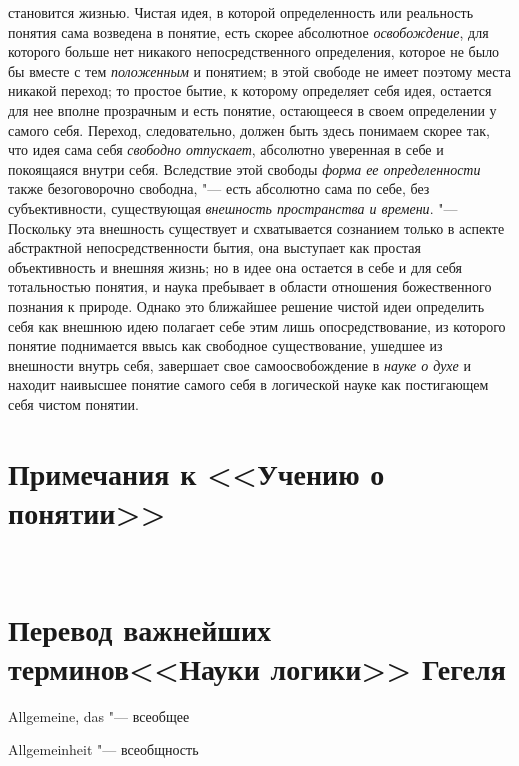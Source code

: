 {{{становится жизнью}. Чистая идея, в которой определенность
или реальность понятия сама возведена в понятие, есть скорее абсолютное
{\em освобождение}, для
которого больше нет никакого непосредственного определения, которое не было
бы вместе с тем {\em положенным}
и понятием; в этой свободе не имеет поэтому места никакой
переход; то простое бытие, к которому определяет себя идея, остается для
нее вполне прозрачным и есть понятие, остающееся в своем определении у
самого себя. Переход, следовательно, должен быть здесь понимаем скорее так,
что идея сама себя {\em свободно
отпускает}, абсолютно уверенная в себе и покоящаяся внутри
себя. Вследствие этой свободы {\em форма
ее определенности} также безоговорочно свободна, "---
есть абсолютно сама по себе, без субъективности, существующая
{\em внешность пространства и времени}.
"--- Поскольку эта внешность существует и схватывается
сознанием только в аспекте абстрактной непосредственности
бытия, она выступает как простая объективность и внешняя жизнь; но в идее
она остается в себе и для себя тотальностью понятия, и наука пребывает в
области отношения божественного познания к природе. Однако это ближайшее
решение чистой идеи определить себя как внешнюю идею полагает себе этим
лишь опосредствование, из которого понятие поднимается ввысь как свободное
существование, ушедшее из внешности внутрь себя, завершает свое
самоосвобождение в {\em науке о духе}
и находит наивысшее понятие самого себя в логической науке
как постигающем себя чистом понятии.

\clearpage
\chapter[Примечания к <<Учению о понятии>>]{Примечания к <<Учению о понятии>>}
\bigskip
\bigskip
\printpagenotes
\bigskip
\bigskip


\clearpage\
\chapter[Перевод важнейших терминов <<Науки логики>> Гегеля]
{Перевод важнейших терминов\newline<<Науки логики>> Гегеля}

\bigskip

\begin{multicols}{2}
Allgemeine, das "--- всеобщее

Allgemeinheit "--- всеобщность


\end{multicols}}}
